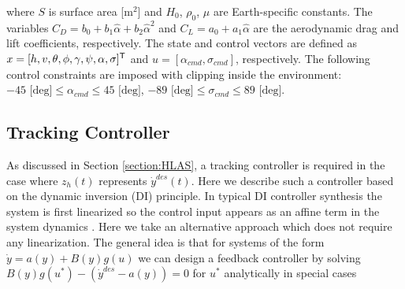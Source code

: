 \documentclass{UnderReview}
\begin{document}
where $S$ is surface area [m$^2$] and $H_0$, $\rho_0$, $\mu$ are Earth-specific constants. The variables $C_D=b_0+b_1\hat\alpha+b_2\hat\alpha^2$ and $C_L=a_0+a_1\hat\alpha$ are the aerodynamic drag and lift coefficients, respectively.  The state and control vectors are defined as $x=[h,v,\theta,\phi,\gamma,\psi, \alpha, \sigma]^\mathsf{T}$ and $u=[\alpha_{cmd}, \sigma_{cmd}]$, respectively.  The following control constraints are imposed with clipping inside the environment: $-45 \text{ [deg]} \leq \alpha_{cmd} \leq 45\text{ [deg]}$, $-89\text{ [deg]} \leq \sigma_{cmd} \leq 89\text{ [deg]}$.


\subsection{Tracking Controller} \label{section:NumericalExp_TrackingController}
As discussed in Section \ref{section:HLAS}, a tracking controller is required in the case where $z_h(t)$ represents $\dot y^{des}(t)$.  Here we describe such a controller based on the dynamic inversion (DI) principle.  In typical DI controller synthesis the system is first linearized so the control input appears as an affine term in the system dynamics \cite{tipan2020nonlinear}.  Here we take an alternative approach which does not require any linearization.  The general idea is that for systems of the form $\dot y = a(y)+B(y)g(u)$ we can design a feedback controller by solving $B(y)g(u^*)-\left(\dot y^{des}-a(y)\right)=0$ for $u^*$ analytically in special cases  
	
\end{document}
